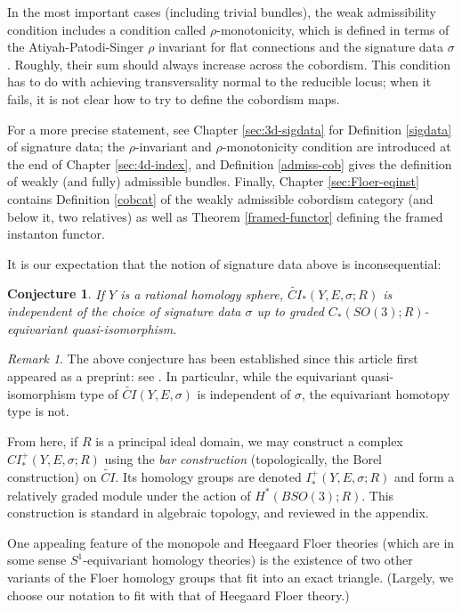 \documentclass{memo-l}
\newtheorem{conjecture}[theorem]{Conjecture} %
\theoremstyle{definition}
\theoremstyle{remark}
\newtheorem{remark}[theorem]{Remark}
\numberwithin{section}{chapter}
\numberwithin{equation}{chapter}
\begin{document}
In the most important cases (including trivial bundles), the weak admissibility condition includes a condition called $\rho$-monotonicity, which is defined in terms of the Atiyah-Patodi-Singer $\rho$ invariant for flat connections and the signature data $\sigma$. Roughly, their sum should always increase across the cobordism. This condition has to do with achieving transversality normal to the reducible locus; when it fails, it is not clear how to try to define the cobordism maps.

For a more precise statement, see Chapter \ref{sec:3d-sigdata} for Definition \ref{sigdata} of signature data; the $\rho$-invariant and $\rho$-monotonicity condition are introduced at the end of Chapter \ref{sec:4d-index}, and Definition \ref{admiss-cob} gives the definition of weakly (and fully) admissible bundles. Finally, Chapter \ref{sec:Floer-eqinst} contains Definition \ref{cobcat} of the weakly admissible cobordism category (and below it, two relatives) as well as Theorem \ref{framed-functor} defining the framed instanton functor. 

It is our expectation that the notion of signature data above is inconsequential:

\begin{conjecture}If $Y$ is a rational homology sphere, $\widetilde{CI}_*(Y,E,\sigma;R)$ is independent of the choice of signature data $\sigma$ up to graded $C_*(SO(3);R)$-equivariant quasi-isomorphism.
\end{conjecture}

\begin{remark}
The above conjecture has been established since this article first appeared as a preprint: see \cite[Theorem 2.9]{DME}. In particular, while the equivariant quasi-isomorphism type of $\widetilde{CI}(Y, E, \sigma)$ is independent of $\sigma$, the equivariant homotopy type is not. 
\end{remark}

From here, if $R$ is a principal ideal domain, we may construct a complex $CI^+_*(Y,E,\sigma;R)$ using the \emph{bar construction} (topologically, the Borel construction) on $\widetilde{CI}$. Its homology groups are denoted $I^+_*(Y,E,\sigma;R)$ and form a relatively graded module under the action of $H^*(BSO(3);R)$. This construction is standard in algebraic topology, and reviewed in the appendix. 

One appealing feature of the monopole and Heegaard Floer theories (which are in some sense $S^1$-equivariant homology theories) is the existence of two other variants of the Floer homology groups that fit into an exact triangle. (Largely, we choose our notation to fit with that of Heegaard Floer theory.) 
\end{document}

